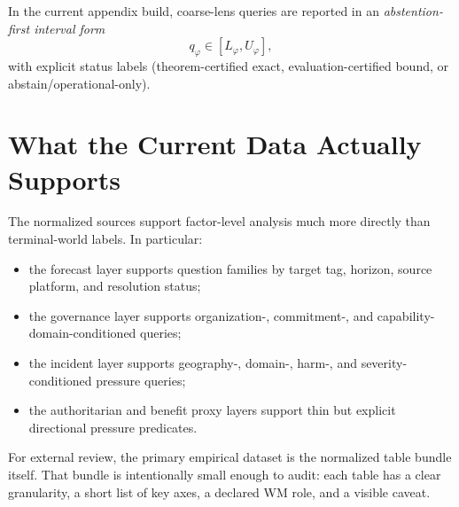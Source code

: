 \documentclass[11pt,openany]{report}
\begin{document}
In the current appendix build, coarse-lens queries are reported in an
\emph{abstention-first interval form}
\[
  q_{\varphi} \in [L_{\varphi}, U_{\varphi}],
\]
with explicit status labels (theorem-certified exact, evaluation-certified
bound, or abstain/operational-only).

\section{What the Current Data Actually Supports}

The normalized sources support factor-level analysis much more directly
than terminal-world labels.  In particular:
\begin{itemize}
\item the forecast layer supports question families by target tag, horizon,
  source platform, and resolution status;
\item the governance layer supports organization-, commitment-, and
  capability-domain-conditioned queries;
\item the incident layer supports geography-, domain-, harm-, and
  severity-conditioned pressure queries;
\item the authoritarian and benefit proxy layers support thin but explicit
  directional pressure predicates.
\end{itemize}
For external review, the primary empirical dataset is the normalized
table bundle itself.  That bundle is intentionally small enough to audit:
each table has a clear granularity, a short list of key axes, a declared
WM role, and a visible caveat.

\begin{table}[htbp]
\centering
\caption{Normalized appendix datasets for review: what each table is,
what it supports, and its main limitation.}
\label{tab:ai-outcomes-dataset-inventory}
\end{table}
\end{document}
